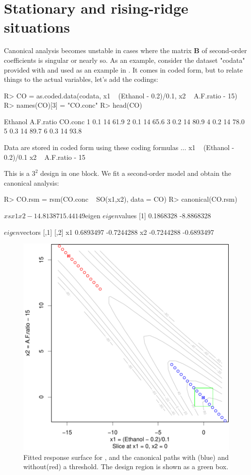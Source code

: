 \documentclass[article,nojss]{jss}
\def\rsm{\pkg{rsm}}
\def\bB{\mathbf{B}}
\begin{document}
\section{Stationary and rising-ridge situations}
Canonical analysis becomes unstable in cases where the matrix $\bB$ of second-order coefficients is singular or nearly so. As an example, consider the dataset "codata" provided with \rsm{} and used as an example in \cite{Box05}. It comes in coded form, but to relate things to the actual variables, let's add the codings:
\begin{Schunk}
\begin{Sinput}
R> CO = as.coded.data(codata,  x1 ~ (Ethanol - 0.2)/0.1,  x2 ~ A.F.ratio - 15)
R> names(CO)[3] = "CO.conc"
R> head(CO)
\end{Sinput}
\begin{Soutput}
  Ethanol A.F.ratio CO.conc
1     0.1        14    61.9
2     0.1        14    65.6
3     0.2        14    80.9
4     0.2        14    78.0
5     0.3        14    89.7
6     0.3        14    93.8

Data are stored in coded form using these coding formulas ...
x1 ~ (Ethanol - 0.2)/0.1
x2 ~ A.F.ratio - 15
\end{Soutput}
\end{Schunk}
This is a $3^2$ design in one block. We fit a second-order model and obtain the canonical analysis:
\begin{Schunk}
\begin{Sinput}
R> CO.rsm = rsm(CO.conc ~ SO(x1,x2), data = CO)
R> canonical(CO.rsm)
\end{Sinput}
\begin{Soutput}
$xs
       x1        x2 
-14.81387  15.44149 

$eigen
$eigen$values
[1]  0.1868328 -8.8868328

$eigen$vectors
         [,1]       [,2]
x1  0.6893497 -0.7244288
x2 -0.7244288 -0.6893497
\end{Soutput}
\end{Schunk}
%
\begin{figure}
\includegraphics[width=.6\textwidth]{rsm-rising-ridge.pdf}

\caption{Fitted response surface for , and the canonical paths with (blue) and without(red) a threshold. The design region is shown as a green box.}\label{rising-ridge}
\end{figure}
\end{document}
